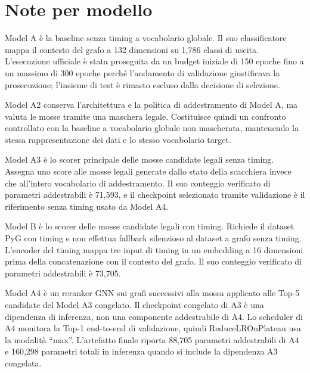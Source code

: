 

\section{Note per modello}
\label{app:hyperparameters:notes}

Model A è la baseline senza timing a vocabolario globale.  Il suo classificatore mappa il contesto del grafo a 132 dimensioni su 1,786 classi di uscita.  L'esecuzione ufficiale è stata proseguita da un budget iniziale di 150 epoche fino a un massimo di 300 epoche perché l'andamento di validazione giustificava la prosecuzione; l'insieme di test è rimasto escluso dalla decisione di selezione.

Model A2 conserva l'architettura e la politica di addestramento di Model A, ma valuta le mosse tramite una maschera legale.  Costituisce quindi un confronto controllato con la baseline a vocabolario globale non mascherata, mantenendo la stessa rappresentazione dei dati e lo stesso vocabolario target.

Model A3 è lo scorer principale delle mosse candidate legali senza timing.  Assegna uno score alle mosse legali generate dallo stato della scacchiera invece che all'intero vocabolario di addestramento.  Il suo conteggio verificato di parametri addestrabili è 71,593, e il checkpoint selezionato tramite validazione è il riferimento senza timing usato da Model A4.

Model B è lo scorer delle mosse candidate legali con timing.  Richiede il dataset PyG con timing e non effettua fallback silenzioso al dataset a grafo senza timing.  L'encoder del timing mappa tre input di timing in un embedding a 16 dimensioni prima della concatenazione con il contesto del grafo.  Il suo conteggio verificato di parametri addestrabili è 73,705.

Model A4 è un reranker GNN sui grafi successivi alla mossa applicato alle Top-5 candidate del Model A3 congelato.  Il checkpoint congelato di A3 è una dipendenza di inferenza, non una componente addestrabile di A4.  Lo scheduler di A4 monitora la Top-1 end-to-end di validazione, quindi ReduceLROnPlateau usa la modalità ``max''.  L'artefatto finale riporta 88,705 parametri addestrabili di A4 e 160,298 parametri totali in inferenza quando si include la dipendenza A3 congelata.
